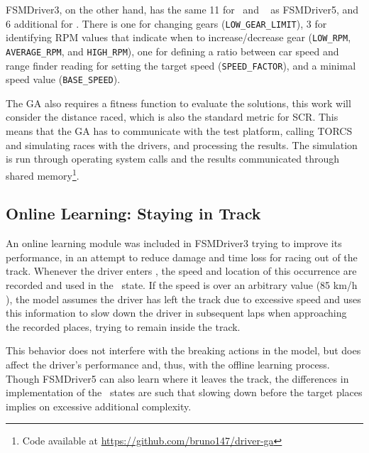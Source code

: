 FSMDriver3, on the other hand, has the same 11 for \OT~and \St~ as FSMDriver5, and 6 additional for \IT. There is one for changing gears (\texttt{LOW\_GEAR\_LIMIT}), 3 for identifying RPM values that indicate when to increase/decrease gear (\texttt{LOW\_RPM}, \texttt{AVERAGE\_RPM}, and \texttt{HIGH\_RPM}), one for defining a ratio between car speed and range finder reading for setting the target speed (\texttt{SPEED\_FACTOR}), and a minimal speed value  (\texttt{BASE\_SPEED}).

The GA also requires a fitness function to evaluate the solutions, this work will consider the distance raced, which is also the standard metric for SCR. This means that the GA has to communicate with the test platform, calling  TORCS and simulating races with the drivers, and processing the results. The simulation is run through operating system calls and the results communicated through shared memory\footnote{Code available at \url{https://github.com/bruno147/driver-ga}}.

\subsection{Online Learning: Staying in Track}%
An online learning module was included in FSMDriver3 trying to improve its performance, in an attempt to reduce damage and time loss for racing out of the track. Whenever the driver enters \OT, the speed and location of this occurrence are recorded and used in the \racing~state. If the speed is over an arbitrary value (85 km/h ), the model assumes the driver has left the track due to excessive speed and uses this information to slow down the driver in subsequent laps when approaching the recorded places, trying to remain inside the track.

This behavior does not interfere with the breaking actions in the model, but does affect the driver's performance and, thus, with the offline learning process. Though FSMDriver5 can also learn where it leaves the track, the differences in implementation of the \racing~states are such that slowing down before the target places implies on excessive additional complexity.